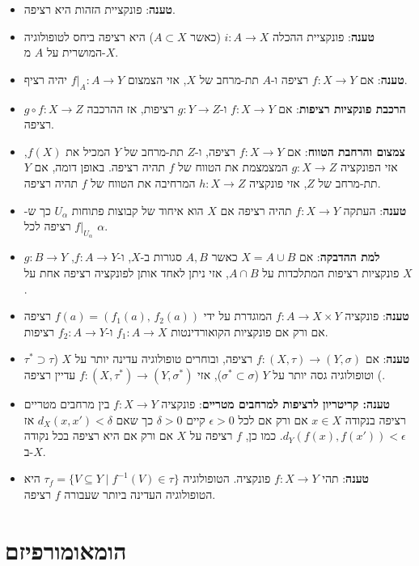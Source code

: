 \documentclass{tstextbook}
\begin{document}
\begin{itemize}
  \item \textbf{טענה}: פונקציית הזהות היא רציפה.
  \item \textbf{טענה}: פונקציית ההכלה \(i: A \to X\) (כאשר \(A \subset X\)) היא רציפה ביחס לטופולוגיה המושרית על \(A\) מ-\(X\).
  \item \textbf{טענה}: אם \(f:X\to Y\) רציפה ו-\(A\) תת-מרחב של \(X\), אזי הצמצום \(f|_{A}:A\to Y\) יהיה רציף.
  \item \textbf{הרכבת פונקציות רציפות}: אם \(f: X \to Y\) ו-\(g: Y \to Z\) רציפות, אז ההרכבה \(g \circ f: X \to Z\) רציפה.
  \item \textbf{צמצום והרחבת הטווח}: אם \(f:X\to Y\) רציפה, ו-\(Z\) תת-מרחב של \(Y\) המכיל את \(f(X)\), אזי הפונקציה \(g:X\to Z\) המצמצמת את הטווח של \(f\) תהיה רציפה. באופן דומה, אם \(Y\) תת-מרחב של \(Z\), אזי פונקציה \(h:X\to Z\) המרחיבה את הטווח של \(f\) תהיה רציפה.
  \item \textbf{טענה}: העתקה \(f:X\to Y\) תהיה רציפה אם \(X\) הוא איחוד של קבוצות פתוחות \(U_{\alpha}\) כך ש-\(f|_{U_{\alpha}}\) רציפה לכל \(\alpha\).
  \item \textbf{למת ההדבקה}: אם \(X=A\cup B\) כאשר \(A,B\) סגורות ב-\(X\), ו-\(f:A\to Y\), \(g:B\to Y\) פונקציות רציפות המתלכדות על \(A \cap B\), אזי ניתן לאחד אותן לפונקציה רציפה אחת על \(X\).
  \item \textbf{טענה}: פונקציה \(f:A\to X\times Y\) המוגדרת על ידי \(f(a)=(f_{1}(a),\,f_{2}(a))\) רציפה אם ורק אם פונקציות הקואורדינטות \(f_{1}:A\to X\) ו-\(f_{2}:A\to Y\) רציפות.
  \item \textbf{טענה}: אם \(f: (X, \tau) \to (Y, \sigma)\) רציפה, ובוחרים טופולוגיה עדינה יותר על \(X\) (\(\tau^* \supset \tau\)) וטופולוגיה גסה יותר על \(Y\) (\(\sigma^* \subset \sigma\)), אזי \(f: (X, \tau^*) \to (Y, \sigma^*)\) עדיין רציפה.
  \item \textbf{טענה: קריטריון לרציפות למרחבים מטריים}: פונקציה \(f: X \to Y\) בין מרחבים מטריים רציפה בנקודה \(x \in X\) אם ורק אם לכל \(\epsilon > 0\) קיים \(\delta > 0\) כך שאם \(d_X(x, x') < \delta\) אז \(d_Y(f(x), f(x')) < \epsilon\). כמו כן, \(f\) רציפה על \(X\) אם ורק אם היא רציפה בכל נקודה ב-\(X\).
  \item \textbf{טענה}: תהי \(f:X\to Y\) פונקציה. הטופולוגיה \(\tau_f = \{ V \subseteq Y \mid f^{-1}(V) \in \tau \}\) היא הטופולוגיה העדינה ביותר שעבורה \(f\) רציפה.
\end{itemize}
\section{הומאומורפיזם}
\end{document}
